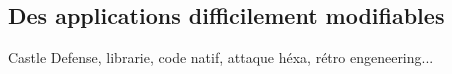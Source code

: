 
\subsection{Des applications difficilement modifiables}

Castle Defense, librarie, code natif, attaque héxa, rétro engeneering...
